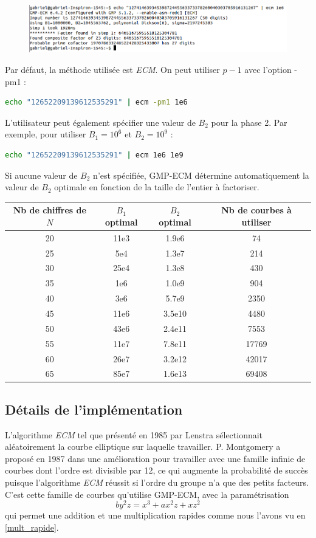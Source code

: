 \documentclass[11pt,a4paper]{article}
\begin{document}
\begin{figure}[!h]
\includegraphics[scale=0.5]{images/gmp-ecm1.png}
\end{figure}

Par défaut, la méthode utilisée est \textit{ECM}. On peut utiliser $p-1$ avec l'option -pm1 : 

\begin{lstlisting}[language=bash]
	echo "12652209139612535291" | ecm -pm1 1e6
\end{lstlisting}

L'utilisateur peut également spécifier une valeur de $B_2$ pour la phase 2. Par exemple, pour utiliser $B_1=10^6$ et $B_2=10^9$ : 

\begin{lstlisting}[language=bash]
	echo "12652209139612535291" | ecm 1e6 1e9
\end{lstlisting}

Si aucune valeur de $B_2$ n'est spécifiée, \textsf{GMP-ECM} détermine automatiquement la valeur de $B_2$ optimale en fonction de la taille de l'entier à factoriser.
\medskip

\begin{tabular}{|c|c|c|c|}
  \hline
  Nb de chiffres de $N$ & $B_1$ optimal & $B_2$ optimal & Nb de courbes à utiliser \\
  \hline
  20 & 11e3 & 1.9e6 	& 74  \\
  25 & 5e4 & 1.3e7 & 214 \\
  30 & 25e4 & 1.3e8 & 430 \\
  35 & 1e6 & 1.0e9 & 904 \\
  40 & 3e6 & 5.7e9 & 2350 \\
  45 & 11e6 & 3.5e10 & 4480 \\
  50 & 43e6 & 2.4e11 & 7553 \\
  55 & 11e7 & 7.8e11 & 17769 \\
  60 & 26e7 & 3.2e12 & 42017 \\
  65 & 85e7 & 1.6e13 & 69408 \\
  \hline
\end{tabular}

\subsection{Détails de l'implémentation}
L'algorithme \textit{ECM} tel que présenté en 1985 par Lenstra sélectionnait aléatoirement la courbe elliptique sur laquelle travailler. P. Montgomery a proposé en 1987 dans \cite{montgomery} une amélioration pour travailler avec une famille infinie de courbes dont l'ordre est divisible par 12, ce qui augmente la probabilité de succès puisque l'algorithme \textit{ECM} réussit si l'ordre du groupe n'a que des petits facteurs. C'est cette famille de courbes qu'utilise \textsf{GMP-ECM}, avec la paramétrisation 
\[
by^2z = x^3 + ax^2z + xz^2
\]
qui permet une addition et une multiplication rapides comme nous l'avons vu en \ref{mult_rapide}. \\
\end{document}
